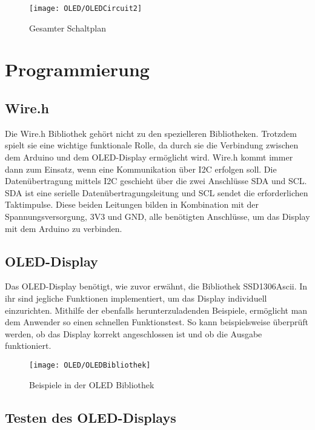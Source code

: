 \begin{figure}
    \texttt{[image: OLED/OLEDCircuit2]}
    \caption{Gesamter Schaltplan}\label{OLEDCurcuit}
\end{figure}


\section{Programmierung}
\subsection{\textcolor{FileColor}{Wire.h}}

Die \textcolor{FileColor}{Wire.h} Bibliothek gehört nicht zu den spezielleren Bibliotheken. Trotzdem spielt sie eine wichtige funktionale Rolle, da durch sie die Verbindung zwischen dem Arduino und dem OLED-Display ermöglicht wird. \textcolor{FileColor}{Wire.h} kommt immer dann zum Einsatz, wenn eine Kommunikation über I2C erfolgen soll. Die Datenübertragung mittels I2C geschieht über die zwei Anschlüsse SDA und SCL. SDA ist eine serielle Datenübertragungsleitung und SCL sendet die erforderlichen Taktimpulse. Diese beiden Leitungen bilden in Kombination mit der Spannungsversorgung, 3V3 und GND, alle benötigten Anschlüsse, um das Display mit dem Arduino zu verbinden.   


\subsection{OLED-Display}

Das OLED-Display benötigt, wie zuvor erwähnt, die  Bibliothek SSD1306Ascii. In ihr sind jegliche Funktionen implementiert, um das Display individuell einzurichten. Mithilfe der ebenfalls herunterzuladenden Beispiele, ermöglicht man dem Anwender so einen schnellen Funktionstest. So kann beispielsweise überprüft werden, ob das Display korrekt angeschlossen ist und ob die Ausgabe funktioniert.

\begin{figure}[H]
    \centering
    \texttt{[image: OLED/OLEDBibliothek]}
    \caption{Beispiele in der OLED Bibliothek}
\end{figure}

\subsection{Testen des OLED-Displays}


